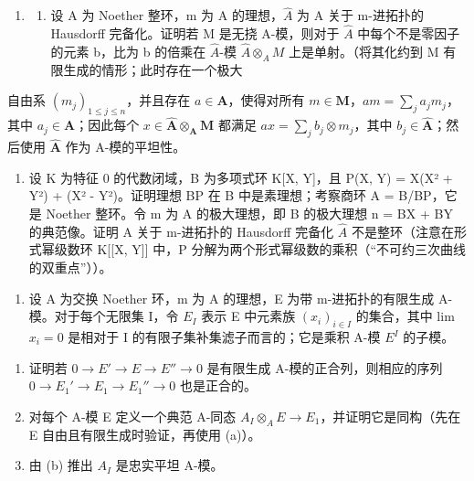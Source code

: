 \begin{enumerate}
\def\labelenumi{\arabic{enumi}.}
\setcounter{enumi}{14}
\tightlist
\item
  \begin{enumerate}
  \def\labelenumii{(\alph{enumii})}
  \tightlist
  \item
    设 A 为 Noether 整环，m 为 A 的理想，\(\hat{A}\) 为 A 关于 m-进拓扑的 Hausdorff 完备化。证明若 M 是无挠 A-模，则对于 \(\hat{A}\) 中每个不是零因子的元素 b，比为 b 的倍乘在 \(\hat{A}\)-模 \(\hat{A} \otimes_{A} M\) 上是单射。（将其化约到 M 有限生成的情形；此时存在一个极大
  \end{enumerate}
\end{enumerate}

 自由系 \((m_j)_{1\leqslant j\leqslant n}\)，并且存在 \(a\in \mathbf{A}\)，使得对所有 \(m\in \mathbf{M}\)，\(am = \sum_{j}a_{j}m_{j}\)，其中 \(a_{j}\in \mathbf{A}\)；因此每个 \(x\in \hat{\mathbf{A}}\otimes_{\mathbf{A}}\mathbf{M}\) 都满足 \(ax = \sum_{j}b_{j}\otimes m_{j}\)，其中 \(b_{j}\in \hat{\mathbf{A}}\)；然后使用 \(\hat{\mathbf{A}}\) 作为 A-模的平坦性。

\begin{enumerate}
\def\labelenumi{(\alph{enumi})}
\setcounter{enumi}{1}
\tightlist
\item
  设 K 为特征 0 的代数闭域，B 为多项式环 K{[}X, Y{]}，且 P(X, Y) = X(X² + Y²) + (X² - Y²)。证明理想 BP 在 B 中是素理想；考察商环 A = B/BP，它是 Noether 整环。令 m 为 A 的极大理想，即 B 的极大理想 n = BX + BY 的典范像。证明 A 关于 m-进拓扑的 Hausdorff 完备化 \(\hat{A}\) 不是整环（注意在形式幂级数环 K{[}{[}X, Y{]}{]} 中，P 分解为两个形式幂级数的乘积（``不可约三次曲线的双重点''））。
\end{enumerate}

\begin{enumerate}
\def\labelenumi{\arabic{enumi}.}
\setcounter{enumi}{15}
\tightlist
\item
  设 A 为交换 Noether 环，m 为 A 的理想，E 为带 m-进拓扑的有限生成 A-模。对于每个无限集 I，令 \(E_{I}\) 表示 E 中元素族 \((x_{i})_{i\in I}\) 的集合，其中 lim \(x_{i}=0\) 是相对于 I 的有限子集补集滤子而言的；它是乘积 A-模 \(E^{I}\) 的子模。
\end{enumerate}

\begin{enumerate}
\def\labelenumi{(\alph{enumi})}
\item
  证明若 \(0 \rightarrow E' \rightarrow E \rightarrow E'' \rightarrow 0\) 是有限生成 A-模的正合列，则相应的序列 \(0 \rightarrow E_{1}' \rightarrow E_{1} \rightarrow E_{1}'' \rightarrow 0\) 也是正合的。
\item
  对每个 A-模 E 定义一个典范 A-同态 \(A_{I} \otimes_{A} E \to E_{1}\)，并证明它是同构（先在 E 自由且有限生成时验证，再使用 (a)）。
\item
  由 (b) 推出 \(A_{I}\) 是忠实平坦 A-模。
\end{enumerate}

